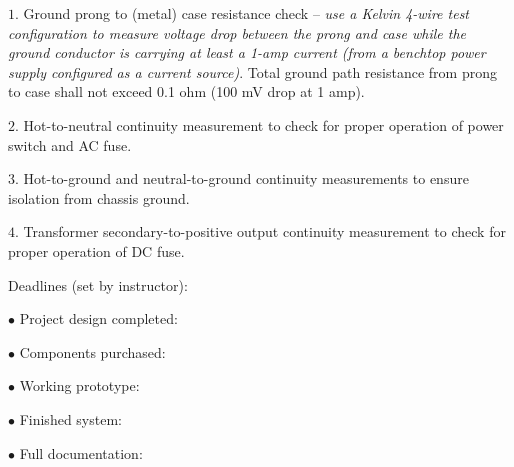 \medskip
\goodbreak
\item{$1.$} Ground prong to (metal) case resistance check -- {\it use a Kelvin 4-wire test configuration to measure voltage drop between the prong and case while the ground conductor is carrying at least a 1-amp current (from a benchtop power supply configured as a current source)}.  Total ground path resistance from prong to case shall not exceed 0.1 ohm (100 mV drop at 1 amp).
\item{$2.$} Hot-to-neutral continuity measurement to check for proper operation of power switch and AC fuse.
\item{$3.$} Hot-to-ground and neutral-to-ground continuity measurements to ensure isolation from chassis ground.
\item{$4.$} Transformer secondary-to-positive output continuity measurement to check for proper operation of DC fuse.
\medskip

\vskip 10pt

\goodbreak
\noindent
Deadlines (set by instructor):

\medskip
\item{$\bullet$} Project design completed: 
\item{$\bullet$} Components purchased:
\item{$\bullet$} Working prototype:
\item{$\bullet$} Finished system:
\item{$\bullet$} Full documentation:
\medskip



